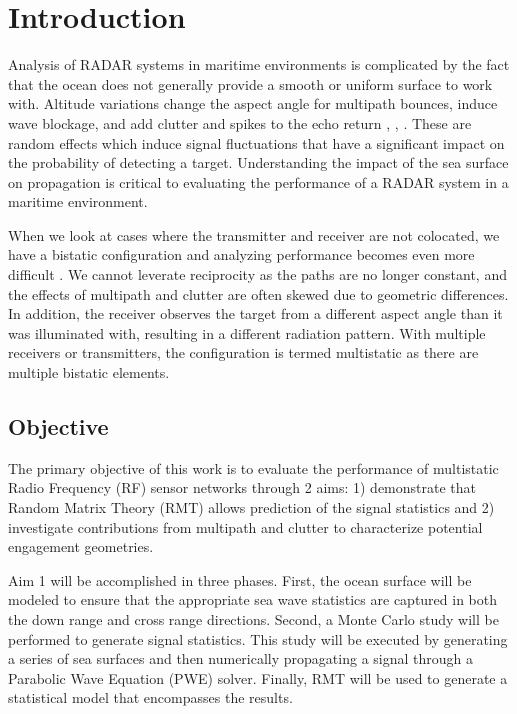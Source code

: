 \chapter{Introduction}
Analysis of RADAR systems in maritime environments is complicated by the fact that the ocean does not generally provide a smooth or uniform surface to work with. Altitude variations change the aspect angle for multipath bounces, induce wave blockage, and add clutter and spikes to the echo return \cite{skolnik_handbook}, \cite{blake_radar}, \cite{nathanson_radar}. These are random effects which induce signal fluctuations that have a significant impact on the probability of detecting a target. Understanding the impact of the sea surface on propagation is critical to evaluating the performance of a RADAR system in a maritime environment.

When we look at cases where the transmitter and receiver are not colocated, we have a bistatic configuration and analyzing performance becomes even more difficult \cite{willis_bistatic}. We cannot leverate reciprocity as the paths are no longer constant, and the effects of multipath and clutter are often skewed due to geometric differences.  In addition, the receiver observes the target from a different aspect angle than it was illuminated with, resulting in a different radiation pattern. With multiple receivers or transmitters, the configuration is termed multistatic as there are multiple bistatic elements.

\section{Objective}
The primary objective of this work is to evaluate the performance of multistatic Radio Frequency (RF) sensor networks through 2 aims: 1) demonstrate that Random Matrix Theory (RMT) allows prediction of the signal statistics and 2) investigate contributions from multipath and clutter to characterize potential engagement geometries. 

Aim 1 will be accomplished in three phases. First, the ocean surface will be modeled to ensure that the appropriate sea wave statistics are captured in both the down range and cross range directions. Second, a Monte Carlo study will be performed to generate signal statistics. This study will be executed by generating a series of sea surfaces and then numerically propagating a signal through a Parabolic Wave Equation (PWE) solver. Finally, RMT will be used to generate a statistical model that encompasses the results.

